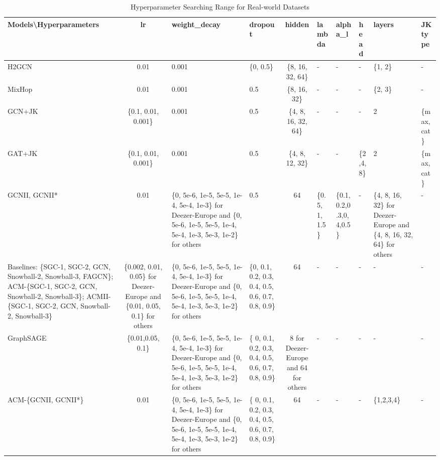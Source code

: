 \documentclass{article}
\newcommand{\0}{{\boldsymbol{0}}}
\newcommand{\6}{{\partial}}
\newcommand{\8}{{\infty}}
\newcommand{\4}{{\nabla}}
\begin{document}
\begin{table}[htbp]
  \centering
  \tiny
  \caption{Hyperparameter Searching Range for Real-world Datasets}
    \begin{tabular}{p{10.875em}|cp{10.125em}p{3.625em}cp{5.065em}p{4.875em}p{3.065em}p{5.5em}p{4.25em}}
    \toprule
    \toprule
    Models\textbackslash{}Hyperparameters & {lr} & weight\_decay & dropout & {hidden} & lambda & alpha\_l & head  & layers & JK type \\
    \midrule
    H2GCN & 0.01  & {0.001} & \{0, 0.5\} & \multicolumn{1}{p{7.125em}}{\{8, 16, 32, 64\}} & -     & -  & -  & \{1, 2\} & - \\
    \midrule
    MixHop & 0.01  & {0.001} & {0.5} & \multicolumn{1}{p{7.125em}}{\{8, 16, 32\}} & -   & -   & -   & \{2, 3\} & - \\
    \midrule
    GCN+JK & \multicolumn{1}{p{4.315em}}{\{0.1, 0.01, 0.001\}} & {0.001} & {0.5} & \multicolumn{1}{p{7.125em}}{\{4, 8, 16, 32, 64\}} & -     & -     & -     & {2} & \multicolumn{1}{p{7.125em}}{\{max, cat\}} \\
    \midrule
     GAT+JK & \multicolumn{1}{p{4.315em}}{\{0.1, 0.01, 0.001\}} & {0.001} & {0.5} & \multicolumn{1}{p{7.125em}}{\{4, 8, 12, 32\}} & -     & -     & \{2,4,8\} & {2} & \multicolumn{1}{p{7.125em}}{\{max, cat\}} \\
    \midrule
    GCNII, GCNII* & 0.01  & \{0, 5e-6, 1e-5, 5e-5, 1e-4, 5e-4, 1e-3\} for Deezer-Europe and \{0, 5e-6, 1e-5, 5e-5, 1e-4, 5e-4, 1e-3, 5e-3, 1e-2\} for others & {0.5} & 64    & \{0.5, 1, 1.5\} & \{0.1,0.2,0.3,0,4,0.5\} & -     & \{4, 8, 16, 32\} for Deezer-Europe and \{4, 8, 16, 32, 64\} for others & - \\
    \midrule
    Baselines: \{SGC-1, SGC-2, GCN, Snowball-2, Snowball-3, FAGCN\}; ACM-\{SGC-1, SGC-2, GCN, Snowball-2, Snowball-3\}; ACMII-\{SGC-1, SGC-2, GCN, Snowball-2, Snowball-3\} & \multicolumn{1}{p{4.315em}}{\{0.002, 0.01, 0.05\} for Deezer-Europe and \{0.01, 0.05, 0.1\} for others} & \{0, 5e-6, 1e-5, 5e-5, 1e-4, 5e-4, 1e-3\} for Deezer-Europe and \{0, 5e-6, 1e-5, 5e-5, 1e-4, 5e-4, 1e-3, 5e-3, 1e-2\} for others & \{0, 0.1, 0.2, 0.3, 0.4, 0.5, 0.6, 0.7, 0.8, 0.9\} & 64    & -     & -     & -     & -     & - \\
    \midrule
    GraphSAGE & \multicolumn{1}{p{4.315em}}{\{0.01,0.05, 0.1\}} & \{0, 5e-6, 1e-5, 5e-5, 1e-4, 5e-4, 1e-3\} for Deezer-Europe and \{0, 5e-6, 1e-5, 5e-5, 1e-4, 5e-4, 1e-3, 5e-3, 1e-2\} for others & \{ 0, 0.1, 0.2, 0.3, 0.4, 0.5, 0.6, 0.7, 0.8, 0.9\} & \multicolumn{1}{p{7.125em}}{8 for Deezer-Europe and 64 for others} & -     & -     & -     & -     & - \\
    \midrule
    ACM-\{GCNII, GCNII*\} & 0.01  & \{0, 5e-6, 1e-5, 5e-5, 1e-4, 5e-4, 1e-3\} for Deezer-Europe and \{0, 5e-6, 1e-5, 5e-5, 1e-4, 5e-4, 1e-3, 5e-3, 1e-2\} for others & \{ 0, 0.1, 0.2, 0.3, 0.4, 0.5, 0.6, 0.7, 0.8, 0.9\} & 64    & -     & -     & -     & \{1,2,3,4\} & - \\
    \bottomrule
    \bottomrule
    \end{tabular}\label{tab:real_world_datasets_hyperparameter_searching_range}\end{table} 
\end{document}
